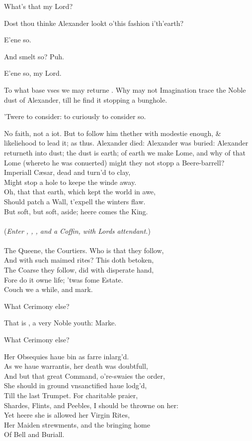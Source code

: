 \documentclass[a5paper,DIV=calc,11pt]{scrbook}
\begin{document}
\begin{drama*}
    \horspeaks What's that my Lord?
    
    \hamspeaks Dost thou thinke Alexander lookt o'this fashion i'th'earth?
    
    \horspeaks E'ene so.
    
    \hamspeaks And smelt so? Puh.
    
    \horspeaks E'ene so, my Lord.
    
    \hamspeaks To what base vses we may returne \hor. Why may not Imagination trace the Noble dust of Alexander, till he find it stopping a bunghole.
    
    \horspeaks 'Twere to consider: to curiously to consider so.
    
    \hamspeaks No faith, not a iot. But to follow him thether with modestie enough, \& likeliehood to lead it; as thus. Alexander died: Alexander was buried: Alexander returneth into dust; the dust is earth; of earth we make Lome, and why of that Lome (whereto he was conuerted) might they not stopp a Beere-barrell?\\
    Imperiall Cæsar, dead and turn'd to clay,\\
    Might stop a hole to keepe the winde away.\\
    Oh, that that earth, which kept the world in awe,\\
    Should patch a Wall, t'expell the winters flaw.\\
    But soft, but soft, aside; heere comes the King.\\
    \mbox{}\\
    (\textit{Enter \king, \queen, \laer, and a Coffin, with Lords attendant.})\\
    \mbox{}\\
    The Queene, the Courtiers. Who is that they follow,\\
    And with such maimed rites? This doth betoken,\\
    The Coarse they follow, did with disperate hand,\\
    Fore do it owne life; 'twas fome Estate.\\
    Couch we a while, and mark.
    
    \laerspeaks What Cerimony else?
    
    \hamspeaks That is \laer, a very Noble youth: Marke.
    
    \laerspeaks What Cerimony else?
    
     Her Obsequies haue bin as farre inlarg'd.\\
    As we haue warrantis, her death was doubtfull,\\
    And but that great Command, o're-swaies the order,\\
    She should in ground vnsanctified haue lodg'd,\\
    Till the last Trumpet. For charitable praier,\\
    Shardes, Flints, and Peebles, I should be throwne on her:\\
    Yet heere she is allowed her Virgin Rites,\\
    Her Maiden strewments, and the bringing home\\
    Of Bell and Buriall.
    

\end{drama*}
\end{document}
